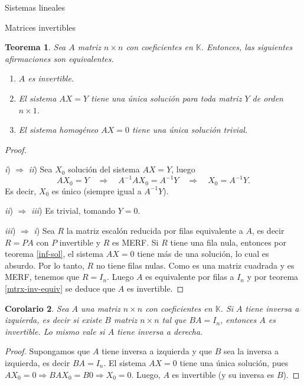 \documentclass[a4paper,12pt,twoside,spanish]{amsbook}
\newtheorem{teorema}{Teorema}[section]
\newtheorem{corolario}[teorema]{Corolario}
\theoremstyle{definition}
\theoremstyle{remark}
\newcommand{\K}{\mathbb K}
\begin{document}
\begin{chapter}{Sistemas lineales}
\begin{section}{Matrices invertibles}
			
			\begin{teorema}\label{mtrx-inv-equiv2} 
				Sea $A$ matriz $n \times n$ con coeficientes en $\K$. Entonces,  las siguientes afirmaciones son equivalentes. 
				\begin{enumerate}
					\item[\textit{i})] $A$ es invertible.
					\item[\textit{ii})] El sistema $AX=Y$ tiene una única solución para toda matriz $Y$ de orden $n \times 1$. 
					\item[\textit{iii})] El sistema homogéneo $AX=0$ tiene una única solución trivial.
				\end{enumerate}
			\end{teorema}
			\begin{proof}
				
				\
				
				\textit{i}) $\Rightarrow$  \textit{ii}) Sea $X_0$ solución del sistema $AX=Y$, luego
				\begin{equation*}
				AX_0=Y  \quad \Rightarrow \quad  A^{-1}AX_0 = A^{-1}Y  \quad \Rightarrow \quad  X_0 = A^{-1}Y.
				\end{equation*}
				Es decir, $X_0$ es único (siempre igual  a $A^{-1}Y$).  
				
				
				\textit{ii}) $\Rightarrow$  \textit{iii}) Es trivial, tomando $Y =0$.
				
				
				
				\textit{iii}) $\Rightarrow$  \textit{i}) Sea $R$ la matriz escalón reducida por filas equivalente a $A$, es decir $R=PA$ con $P$ invertible y $R$ es MERF. Si $R$ tiene una fila nula, entonces por teorema \ref{inf-sol},  el sistema $AX =0$ tiene más de una solución, lo cual es absurdo.  Por lo tanto, $R$ no tiene filas nulas. Como es una matriz cuadrada y es MERF, tenemos que $R=I_n$. Luego $A$ es equivalente por filas a $I_n$ y por teorema \ref{mtrx-inv-equiv} se deduce que $A$ es invertible. 			
				
			\end{proof}
			
			\begin{corolario}
				Sea $A$ una matriz $n \times n$ con coeficientes  en $\K$. Si $A$ tiene inversa a izquierda,  es decir si existe $B$ matriz $n \times n$ tal que $BA=I_n$,   entonces $A$ es invertible.  Lo mismo vale si $A$ tiene inversa a derecha. 
			\end{corolario}	
			\begin{proof}
				Supongamos que  $A$ tiene inversa a izquierda y  que $B$ sea la inversa a izquierda,  es decir $BA=I_n$. El sistema $AX=0$ tiene una única solución, pues $AX_0=0 \Rightarrow BAX_0=B0 \Rightarrow X_0=0$. Luego, $A$  es invertible (y su inversa es $B$). 
				

\end{proof}
\end{section}
\end{chapter}
\end{document}
